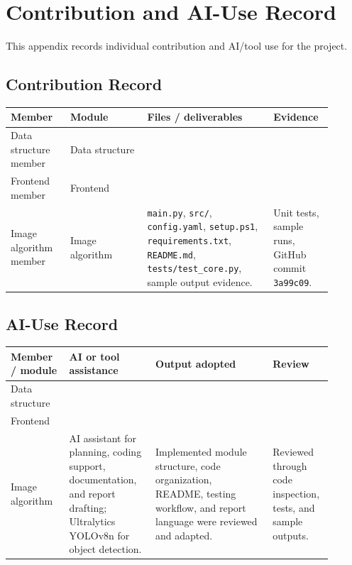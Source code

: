 \section{Contribution and AI-Use Record}

This appendix records individual contribution and AI/tool use for the project.

\subsection{Contribution Record}

\begin{longtable}{|p{0.17\linewidth}|p{0.22\linewidth}|p{0.36\linewidth}|p{0.15\linewidth}|}
\hline
\textbf{Member} & \textbf{Module} & \textbf{Files / deliverables} & \textbf{Evidence} \\
\hline
Data structure member & Data structure &  &  \\
\hline
Frontend member & Frontend &  &  \\
\hline
Image algorithm member & Image algorithm & \texttt{main.py}, \texttt{src/}, \texttt{config.yaml}, \texttt{setup.ps1}, \texttt{requirements.txt}, \texttt{README.md}, \texttt{tests/test\_core.py}, sample output evidence. & Unit tests, sample runs, GitHub commit \texttt{3a99c09}. \\
\hline
\end{longtable}


\subsection{AI-Use Record}

\begin{longtable}{|p{0.17\linewidth}|p{0.25\linewidth}|p{0.34\linewidth}|p{0.14\linewidth}|}
\hline
\textbf{Member / module} & \textbf{AI or tool assistance} & \textbf{Output adopted} & \textbf{Review} \\
\hline
Data structure &  &  &  \\
\hline
Frontend &  &  &  \\
\hline
Image algorithm & AI assistant for planning, coding support, documentation, and report drafting; Ultralytics YOLOv8n for object detection. & Implemented module structure, code organization, README, testing workflow, and report language were reviewed and adapted. & Reviewed through code inspection, tests, and sample outputs. \\
\hline
\end{longtable}

